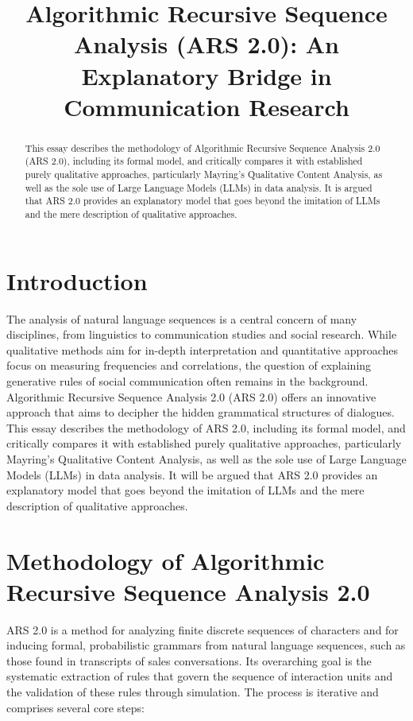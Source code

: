 \documentclass{article}
\title{Algorithmic Recursive Sequence Analysis (ARS 2.0): An Explanatory Bridge in Communication Research}
\author{} %
\date{} %
\begin{document}
\maketitle

\begin{abstract}
This essay describes the methodology of Algorithmic Recursive Sequence Analysis 2.0 (ARS 2.0), including its formal model, and critically compares it with established purely qualitative approaches, particularly Mayring's Qualitative Content Analysis, as well as the sole use of Large Language Models (LLMs) in data analysis. It is argued that ARS 2.0 provides an explanatory model that goes beyond the imitation of LLMs and the mere description of qualitative approaches.
\end{abstract}

\section{Introduction}
The analysis of natural language sequences is a central concern of many disciplines, from linguistics to communication studies and social research. While qualitative methods aim for in-depth interpretation and quantitative approaches focus on measuring frequencies and correlations, the question of explaining generative rules of social communication often remains in the background. Algorithmic Recursive Sequence Analysis 2.0 (ARS 2.0) offers an innovative approach that aims to decipher the hidden grammatical structures of dialogues. This essay describes the methodology of ARS 2.0, including its formal model, and critically compares it with established purely qualitative approaches, particularly Mayring's Qualitative Content Analysis, as well as the sole use of Large Language Models (LLMs) in data analysis. It will be argued that ARS 2.0 provides an explanatory model that goes beyond the imitation of LLMs and the mere description of qualitative approaches.

\section{Methodology of Algorithmic Recursive Sequence Analysis 2.0}
ARS 2.0 is a method for analyzing finite discrete sequences of characters and for inducing formal, probabilistic grammars from natural language sequences, such as those found in transcripts of sales conversations. Its overarching goal is the systematic extraction of rules that govern the sequence of interaction units and the validation of these rules through simulation. The process is iterative and comprises several core steps:
\end{document}
